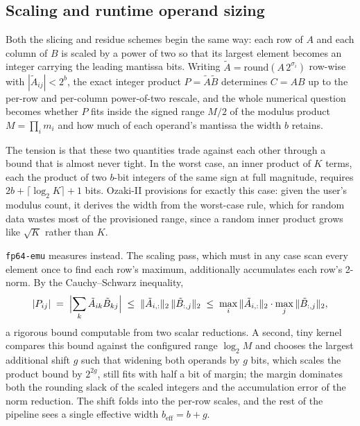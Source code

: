 \documentclass[11pt]{amsart}
\theoremstyle{plain}
\theoremstyle{definition}
\newcommand{\code}[1]{\texttt{#1}}
\newcommand{\fpemu}{\code{fp64-emu}}
\begin{document}
\subsection{Scaling and runtime operand sizing}\label{sec:sizing}

Both the slicing and residue schemes begin the same way: each row of $A$
and each column of $B$ is scaled by a power of two so that its largest
element becomes an integer carrying the leading mantissa bits. Writing
$\tilde{A} = \mathrm{round}(A \, 2^{\sigma_i})$ row-wise with
$|\tilde{A}_{ij}| < 2^{b}$, the exact integer product
$P = \tilde{A}\tilde{B}$ determines $C = AB$ up to the per-row and
per-column power-of-two rescale, and the whole numerical question becomes
whether $P$ fits inside the signed range $M/2$ of the modulus product
$M = \prod_i m_i$ and how much of each operand's mantissa the width $b$
retains.

The tension is that these two quantities trade against each other through
a bound that is almost never tight. In the worst case, an inner product of
$K$ terms, each the product of two $b$-bit integers of the same sign at
full magnitude, requires $2b + \lceil \log_2 K \rceil + 1$ bits. Ozaki-II
provisions for exactly this case: given the user's modulus count, it
derives the width from the worst-case rule, which for random data wastes
most of the provisioned range, since a random inner product grows like
$\sqrt{K}$ rather than $K$.

\fpemu{} measures instead. The scaling pass, which must in any case scan
every element once to find each row's maximum, additionally accumulates
each row's 2-norm. By the Cauchy--Schwarz inequality,
\[
  |P_{ij}| \;=\; \Bigl|\sum_k \tilde{A}_{ik}\tilde{B}_{kj}\Bigr|
  \;\le\; \|\tilde{A}_{i,:}\|_2 \, \|\tilde{B}_{:,j}\|_2
  \;\le\; \max_i \|\tilde{A}_{i,:}\|_2 \cdot \max_j \|\tilde{B}_{:,j}\|_2,
\]
a rigorous bound computable from two scalar reductions. A second, tiny
kernel compares this bound against the configured range $\log_2 M$ and
chooses the largest additional shift $g$ such that widening both operands
by $g$ bits, which scales the product bound by $2^{2g}$, still fits with
half a bit of margin; the margin dominates both the rounding slack of the
scaled integers and the accumulation error of the norm reduction. The
shift folds into the per-row scales, and the rest of the pipeline sees a
single effective width $b_{\mathrm{eff}} = b + g$.
\end{document}
